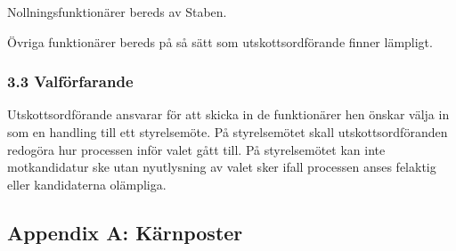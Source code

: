 \documentclass{dsekkallelse}
\begin{document}
Nollningsfunktionärer bereds av Staben. 

Övriga funktionärer bereds på så sätt som utskottsordförande finner lämpligt. 

\subsubsection{3.3 Valförfarande}
Utskottsordförande ansvarar för att skicka in de funktionärer hen önskar välja in som en handling till ett styrelsemöte. På styrelsemötet skall utskottsordföranden redogöra hur processen inför valet gått till. På styrelsemötet kan inte motkandidatur ske utan nyutlysning av valet sker ifall processen anses felaktig eller kandidaterna olämpliga. 

\pagebreak
\subsection{Appendix A: Kärnposter}
\end{document}
